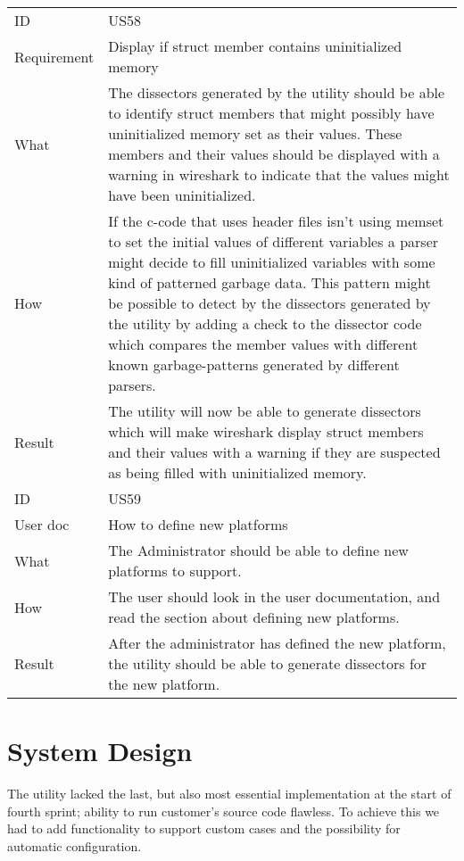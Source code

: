\begin{table}[htbp]
{\begin{tabularx}{1.2\textwidth}{l X}
	\midrule
	ID & US58 \\
	Requirement & Display if \gls{struct} \gls{member} contains uninitialized memory \\
	What & The \glspl{dissector} generated by the \gls{utility} should be able to identify \gls{struct} \glspl{member} that might possibly have uninitialized memory set as their values.
 	These \glspl{member} and their values should be displayed with a warning in \Gls{wireshark} to indicate that the values might have been uninitialized.  \\
	How & If the \Gls{c}-code that uses \gls{header} files isn’t using memset to set the initial values of different variables a \gls{parser} might decide to fill uninitialized variables with some kind of patterned garbage data.
 	This pattern might be possible to detect by the \glspl{dissector} generated by the \gls{utility} by adding a check to the \gls{dissector} code which compares the \gls{member} values with different known garbage-patterns generated by different \glspl{parser}. \\
	Result & The \gls{utility} will now be able to generate \glspl{dissector} which will make \Gls{wireshark} display \gls{struct} \glspl{member} and their values with a warning if they are suspected as being filled with uninitialized memory. \\	
	\midrule
	ID & US59 \\
	User doc & How to define new platforms \\
	What & The Administrator should be able to define new platforms to support.  \\
	How & The user should look in the user documentation, and read the section about defining new platforms. \\
	Result & After the administrator has defined the new platform, the \gls{utility} should be able to generate \glspl{dissector} for the new platform. \\	
	\bottomrule
\end{tabularx}}
\end{table}

\section{System Design}
\label{sec:sp4design}
The utility lacked the last, but also most essential implementation at the start of fourth sprint; ability to run customer's source code flawless. To achieve this we had to add functionality to support custom cases and the possibility for automatic configuration.

